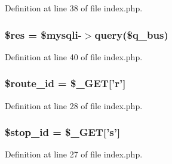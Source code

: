 Definition at line 38 of file index.php.

\hypertarget{index_8php_a49a8a4009b02e49717caa88b128affc5_a49a8a4009b02e49717caa88b128affc5}{
\subsubsection[{\$res}]{\setlength{\rightskip}{0pt plus 5cm}\$res = \$mysqli-\/$>$query(\$q\_\-bus)}}
\label{index_8php_a49a8a4009b02e49717caa88b128affc5_a49a8a4009b02e49717caa88b128affc5}


Definition at line 40 of file index.php.

\hypertarget{index_8php_a053b1e7578c0ad2a0dd68068b071f3ed_a053b1e7578c0ad2a0dd68068b071f3ed}{
\subsubsection[{\$route\_\-id}]{\setlength{\rightskip}{0pt plus 5cm}\$route\_\-id = \$\_\-GET\mbox{[}'r'\mbox{]}}}
\label{index_8php_a053b1e7578c0ad2a0dd68068b071f3ed_a053b1e7578c0ad2a0dd68068b071f3ed}


Definition at line 28 of file index.php.

\hypertarget{index_8php_addc5e9981ac50c577e366f562a9382fe_addc5e9981ac50c577e366f562a9382fe}{
\subsubsection[{\$stop\_\-id}]{\setlength{\rightskip}{0pt plus 5cm}\$stop\_\-id = \$\_\-GET\mbox{[}'s'\mbox{]}}}
\label{index_8php_addc5e9981ac50c577e366f562a9382fe_addc5e9981ac50c577e366f562a9382fe}


Definition at line 27 of file index.php.

